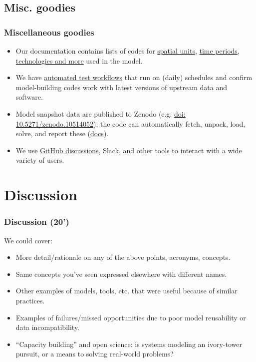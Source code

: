 \documentclass[12pt,aspectratio=169]{beamer}
\begin{document}
\subsection{Misc. goodies}

\begin{frame}
\frametitle{Miscellaneous goodies}

\begin{itemize}
  \item Our documentation contains lists of codes for \href{https://docs.messageix.org/projects/models/en/latest/pkg-data/node.html}{spatial units}, \href{https://docs.messageix.org/projects/models/en/latest/pkg-data/year.html}{time periods}, \href{https://docs.messageix.org/projects/models/en/latest/pkg-data/codelists.html}{technologies and more} used in the model.
  \item We have \href{https://github.com/iiasa/message-ix-models/actions}{automated test workflows} that run on (daily) schedules and confirm model-building codes work with latest versions of upstream data and software.
  \item Model snapshot data are published to Zenodo (e.g. \href{https://doi.org/10.5271/zenodo.10514052}{doi: 10.5271/zenodo.10514052}); the code can automatically fetch, unpack, load, solve, and report these (\href{https://docs.messageix.org/projects/models/en/latest/api/model-snapshot.html}{docs}).
  \item We use \href{https://github.com/iiasa/message_ix/discussions}{GitHub discussions}, Slack, and other tools to interact with a wide variety of users.
\end{itemize}

\end{frame}

\section*{Discussion}

\begin{frame}
\frametitle{Discussion (20’)}

We could cover:

\medskip
\begin{itemize}
  \item More detail/rationale on any of the above points, acronyms, concepts.
  \item Same concepts you've seen expressed elsewhere with different names.
  \item Other examples of models, tools, etc. that were useful because of similar practices.
  \item Examples of failures/missed opportunities due to poor model reusability or data incompatibility.
  \item “Capacity building” and open science: is systems modeling an ivory-tower pursuit, or a means to solving real-world problems?

\end{itemize}
\end{frame}
\end{document}
